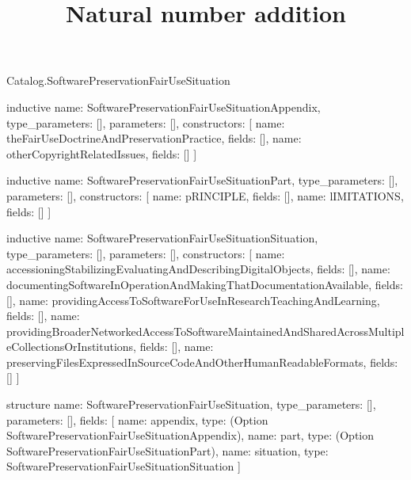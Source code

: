 \begin{lexlean}{Catalog.SoftwarePreservationFairUseSituation}
\title{Natural number addition}
\begin{semanticmodule}
inductive{
  name: SoftwarePreservationFairUseSituationAppendix,
  type_parameters: [],
  parameters: [],
  constructors: [
    {name: theFairUseDoctrineAndPreservationPractice, fields: []},
    {name: otherCopyrightRelatedIssues, fields: []}
  ]
}

inductive{
  name: SoftwarePreservationFairUseSituationPart,
  type_parameters: [],
  parameters: [],
  constructors: [
    {name: pRINCIPLE, fields: []},
    {name: lIMITATIONS, fields: []}
  ]
}

inductive{
  name: SoftwarePreservationFairUseSituationSituation,
  type_parameters: [],
  parameters: [],
  constructors: [
    {name: accessioningStabilizingEvaluatingAndDescribingDigitalObjects, fields: []},
    {name: documentingSoftwareInOperationAndMakingThatDocumentationAvailable, fields: []},
    {name: providingAccessToSoftwareForUseInResearchTeachingAndLearning, fields: []},
    {name: providingBroaderNetworkedAccessToSoftwareMaintainedAndSharedAcrossMultipleCollectionsOrInstitutions, fields: []},
    {name: preservingFilesExpressedInSourceCodeAndOtherHumanReadableFormats, fields: []}
  ]
}

structure{
  name: SoftwarePreservationFairUseSituation,
  type_parameters: [],
  parameters: [],
  fields: [
    {name: appendix, type: (Option SoftwarePreservationFairUseSituationAppendix)},
    {name: part, type: (Option SoftwarePreservationFairUseSituationPart)},
    {name: situation, type: SoftwarePreservationFairUseSituationSituation}
  ]
}
\end{semanticmodule}
\end{lexlean}
